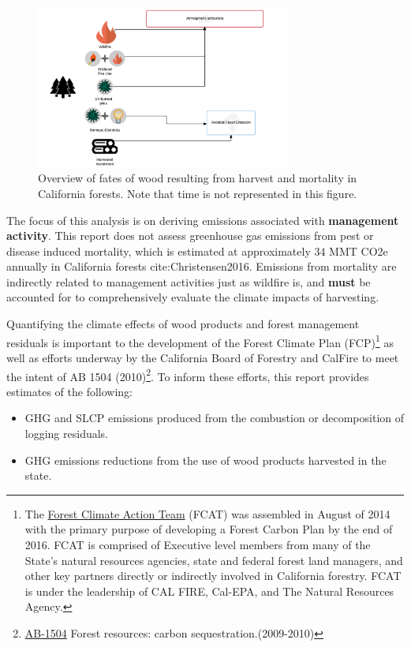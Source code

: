 \documentclass[a4paper]{article}
\begin{document}
\begin{figure}[htb]
\centering
\includegraphics[width=0.75\textwidth]{./graphics/wood_fates.pdf}
\caption{Overview of fates of wood resulting from harvest and mortality in California forests. Note that time is not represented in this figure.}
\end{figure}


The focus of this analysis is on deriving emissions associated with \textbf{management activity}. This report does not assess greenhouse gas emissions from pest or disease induced mortality, which is estimated at approximately 34 MMT CO2e annually in California forests cite:Christensen2016. Emissions from mortality are indirectly related to management activities just as wildfire is, and \textbf{must} be accounted for to comprehensively evaluate the climate impacts of harvesting.    


Quantifying the climate effects of wood products and forest management
residuals is important to the development of the Forest Climate Plan
(FCP)\footnote{The \href{http://www.fire.ca.gov/fcat/}{Forest Climate Action Team} (FCAT) was assembled in August of 2014 with the primary purpose of developing a Forest Carbon Plan by the end of 2016. FCAT is comprised of Executive level members from many of the State’s natural resources agencies, state and federal forest land managers, and other key partners directly or indirectly involved in California forestry. FCAT is under the leadership of CAL FIRE, Cal-EPA, and The Natural Resources Agency.} as well as efforts underway by the California Board of
Forestry and CalFire to meet the intent of AB 1504 (2010)\footnote{\href{http://leginfo.legislature.ca.gov/faces/billTextClient.xhtml?bill_id=200920100AB1504}{AB-1504} Forest resources: carbon sequestration.(2009-2010)}. To
inform these efforts, this report provides estimates of the following:

\begin{itemize}
\item GHG and SLCP emissions produced from the combustion or
decomposition of logging residuals.
\item GHG emissions reductions from the use of wood products harvested in
the state.
\end{itemize}
\end{document}
